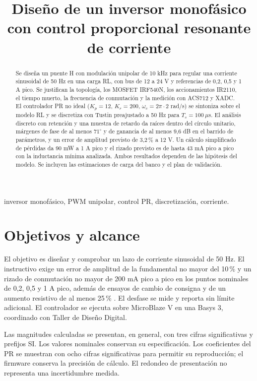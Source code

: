 \documentclass[conference]{IEEEtran}
\begin{document}
\title{Diseño de un inversor monofásico con control proporcional resonante de corriente}
\autores\maketitle
\begin{abstract}
Se diseña un puente H con modulación unipolar de 10 kHz para regular una corriente sinusoidal de 50 Hz en una carga RL, con bus de 12 a 24 V y referencias de 0,2, 0,5 y 1 A pico. Se justifican la topología, los MOSFET IRF540N, los accionamientos IR2110, el tiempo muerto, la frecuencia de conmutación y la medición con ACS712 y XADC. El controlador PR no ideal ($K_p=12$, $K_r=200$, $\omega_c=2\pi\cdot2$ rad/s) se sintoniza sobre el modelo RL y se discretiza con Tustin preajustado a 50 Hz para $T_s=100\ \mu$s. El análisis discreto con retención y una muestra de retardo da raíces dentro del círculo unitario, márgenes de fase de al menos $71^\circ$ y de ganancia de al menos 9,6 dB en el barrido de parámetros, y un error de amplitud previsto de 3,2\,\% a 12 V. Un cálculo simplificado de pérdidas da 90 mW a 1 A pico y el rizado previsto es de hasta 43 mA pico a pico con la inductancia mínima analizada. Ambos resultados dependen de las hipótesis del modelo. Se incluyen las estimaciones de carga del banco y el plan de validación.
\end{abstract}
\begin{IEEEkeywords}inversor monofásico, PWM unipolar, control PR, discretización, corriente.\end{IEEEkeywords}

\section{Objetivos y alcance}
El objetivo es diseñar y comprobar un lazo de corriente sinusoidal de 50 Hz. El instructivo exige un error de amplitud de la fundamental no mayor del 10\,\% y un rizado de conmutación no mayor de 200 mA pico a pico en los puntos nominales de 0,2, 0,5 y 1 A pico, además de ensayos de cambio de consigna y de un aumento resistivo de al menos 25\,\% \cite{enunciado}. El desfase se mide y reporta sin límite adicional. El controlador se ejecuta sobre MicroBlaze V en una Basys 3, coordinado con Taller de Diseño Digital.

Las magnitudes calculadas se presentan, en general, con tres cifras significativas y prefijos SI. Los valores nominales conservan su especificación. Los coeficientes del PR se muestran con ocho cifras significativas para permitir su reproducción; el firmware conserva la precisión de cálculo. El redondeo de presentación no representa una incertidumbre medida.
\end{document}

